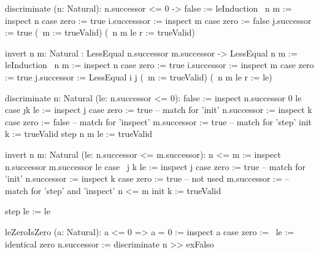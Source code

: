 \begin{alba}
    discriminate (n: Natural): n.successor <= 0 -> false :=
        leInduction
            {\ n m :=
                inspect n case
                    zero := true
                    i.successsor :=
                        inspect m case
                            zero := false
                            j.successor := true}
            (\ m := trueValid)
            (\ n m le r := trueValid)


    invert {n m: Natural}
        : LessEqual n.successor m.successor -> LessEqual n m
    :=
        leInduction
            {\ n m :=
                inspect n case
                    zero := true
                    i.successor :=
                        inspect m case
                            zero := true
                            j.successor :=
                                LessEqual i j}
            (\ m := trueValid)
            (\ n m le r := le)


    discriminate {n: Natural} (le: n.successor <= 0): false :=
        inspect
            n.successor
            0
            le
        case
            {\j k le :=
                inspect j case
                    zero := true -- match for 'init'
                    n.successor :=
                        inspect k case
                            zero := false       -- match for 'inspect'
                            m.successor := true -- match for 'step'
            }
            init k :=
                trueValid
            step n m le :=
                trueValid

    invert {n m: Natural} (le: n.successor <= m.successor): n <= m
    :=
        inspect
            n.successor
            m.successor
            le
        case
            {\ j k le :=
                inspect j case
                    zero := true  -- match for 'init'
                    n.successor :=
                        inspect k case
                            zero := true    -- not used
                            m.successor :=  -- match for 'step' and 'inspect'
                                n <= m}
            init k :=
                trueValid

            step le :=
                le
\end{alba}

\begin{alba}
    leZeroIsZero (a: Natural): a <= 0 => a = 0 :=
        inspect a case
            zero :=
                \ le := identical zero
            n.successor :=
                discriminate {n} >> exFalso
\end{alba}





